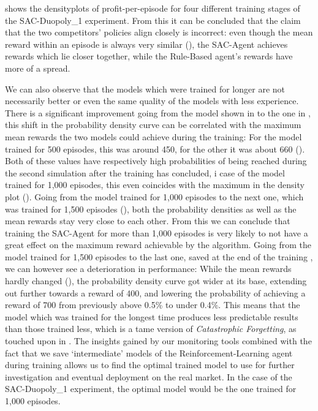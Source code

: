  shows the densityplots of profit-per-episode for four different training stages of the SAC-Duopoly\_1 experiment. From this it can be concluded that the claim that the two competitors' policies align closely is incorrect: even though the mean reward within an episode is always very similar (), the SAC-Agent achieves rewards which lie closer together, while the Rule-Based agent's rewards have more of a spread.

We can also observe that the models which were trained for longer are not necessarily better or even the same quality of the models with less experience. There is a significant improvement going from the model shown in  to the one in , this shift in the probability density curve can be correlated with the maximum mean rewards the two models could achieve during the training: For the model trained for 500 episodes, this was around 450, for the other it was about 660 (). Both of these values have respectively high probabilities of being reached during the second simulation after the training has concluded, i case of the model trained for 1,000 episodes, this even coincides with the maximum in the density plot (). Going from the model trained for 1,000 episodes to the next one, which was trained for 1,500 episodes (), both the probability densities as well as the mean rewards stay very close to each other. From this we can conclude that training the SAC-Agent for more than 1,000 episodes is very likely to not have a great effect on the maximum reward achievable by the algorithm. Going from the model trained for 1,500 episodes to the last one, saved at the end of the training , we can however see a deterioration in performance: While the mean rewards hardly changed (), the probability density curve got wider at its base, extending out further towards a reward of 400, and lowering the probability of achieving a reward of 700 from previously above 0.5\% to under 0.4\%. This means that the model which was trained for the longest time produces less predictable results than those trained less, which is a tame version of \emph{Catastrophic Forgetting}, as touched upon in . The insights gained by our monitoring tools combined with the fact that we save `intermediate' models of the Reinforcement-Learning agent during training allows us to find the optimal trained model to use for further investigation and eventual deployment on the real market. In the case of the SAC-Duopoly\_1 experiment, the optimal model would be the one trained for 1,000 episodes.

